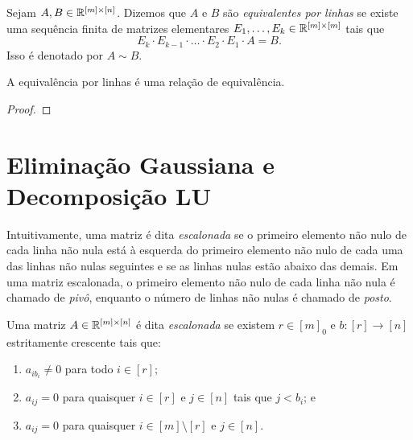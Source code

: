 \begin{definition}
    Sejam $A, B \in \mathbb{R}^{[m] \times [n]}$. Dizemos que $A$ e $B$ são \emph{equivalentes por linhas} se existe uma sequência finita de matrizes elementares $E_1, \ldots, E_k \in \mathbb{R}^{[m] \times [m]}$ tais que 
        \[
            E_k \cdot E_{k-1} \cdot \ldots \cdot E_2 \cdot E_1 \cdot A = B.
        \]
    Isso é denotado por $A \sim B$.
\end{definition}

\begin{proposition}
    A equivalência por linhas é uma relação de equivalência.
\end{proposition}

\begin{proof}
    \blackproof
\end{proof}

\section{Eliminação Gaussiana e Decomposição LU}

Intuitivamente, uma matriz é dita \emph{escalonada} se o primeiro elemento não nulo de cada linha não nula está à esquerda do primeiro elemento não nulo de cada uma das linhas não nulas seguintes e se as linhas nulas estão abaixo das demais. Em uma matriz escalonada, o primeiro elemento não nulo de cada linha não nula é chamado de \emph{pivô}, enquanto o número de linhas não nulas é chamado de \emph{posto}.

\begin{definition}
    Uma matriz $A \in \mathbb{R}^{[m] \times [n]}$ é dita \emph{escalonada} se existem $r \in [m]_0$ e $b : [r] \to [n]$ estritamente crescente tais que:
        \begin{enumerate}[label=\roman*.]
            \item $a_{ib_i} \neq 0$ para todo $i \in [r]$;
            \item $a_{ij} = 0$ para quaisquer $i \in [r]$ e $j \in [n]$ tais que $j < b_i$; e
            \item $a_{ij} = 0$ para quaisquer $i \in [m] \setminus [r]$ e $j \in [n]$.
        \end{enumerate}
\end{definition}

